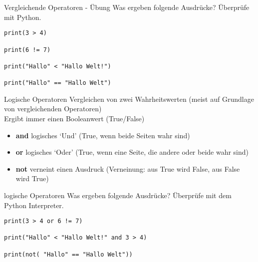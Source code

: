 \begin{frame}[fragile]{Vergleichende Operatoren - Übung}
Was ergeben folgende Ausdrücke? Überprüfe mit  Python.

\begin{lstlisting} 
print(3 > 4) 

print(6 != 7)

print("Hallo" < "Hallo Welt!") 

print("Hallo" == "Hallo Welt")

\end{lstlisting}
\end{frame}



\begin{frame}[fragile]{Logische Operatoren}
Vergleichen von zwei Wahrheitswerten (meist auf Grundlage von vergleichenden Operatoren)\\
Ergibt immer einen Booleanwert (True/False)

\begin{itemize}	
\item \textbf{and}  logisches `Und' (True, wenn beide Seiten wahr sind)
\item \textbf{or}  logisches `Oder' (True, wenn eine Seite, die andere oder beide wahr sind)
\item \textbf{not}  verneint einen Ausdruck (Verneinung: aus True wird False, aus False wird True)
\end{itemize}
\end{frame}

\begin{frame}[fragile]{logische Operatoren}
Was ergeben folgende Ausdrücke? Überprüfe mit dem Python Interpreter.

\begin{lstlisting} 
print(3 > 4 or 6 != 7)

print("Hallo" < "Hallo Welt!" and 3 > 4)

print(not( "Hallo" == "Hallo Welt"))
\end{lstlisting}
\end{frame}







